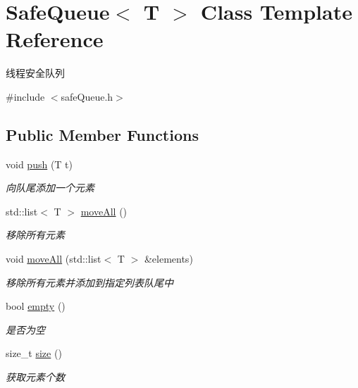 \hypertarget{classSafeQueue}{\section{Safe\-Queue$<$ T $>$ Class Template Reference}
\label{classSafeQueue}
}


线程安全队列  




{\ttfamily \#include $<$safe\-Queue.\-h$>$}

\subsection*{Public Member Functions}
\begin{DoxyCompactItemize}
\item 
\hypertarget{classSafeQueue_a9f9e5e3ad0251438e5d0d22acf42ec6c}{void \hyperlink{classSafeQueue_a9f9e5e3ad0251438e5d0d22acf42ec6c}{push} (T t)}\label{classSafeQueue_a9f9e5e3ad0251438e5d0d22acf42ec6c}

\begin{DoxyCompactList}\small\item\em 向队尾添加一个元素 \end{DoxyCompactList}\item 
std\-::list$<$ T $>$ \hyperlink{classSafeQueue_a0231290c5b785ac7ac5ba966c1160531}{move\-All} ()
\begin{DoxyCompactList}\small\item\em 移除所有元素 \end{DoxyCompactList}\item 
void \hyperlink{classSafeQueue_a1f853236e45bdc59d528b11cd5584d23}{move\-All} (std\-::list$<$ T $>$ \&elements)
\begin{DoxyCompactList}\small\item\em 移除所有元素并添加到指定列表队尾中 \end{DoxyCompactList}\item 
\hypertarget{classSafeQueue_ab28c475e4b507c354d67d63460ca434d}{bool \hyperlink{classSafeQueue_ab28c475e4b507c354d67d63460ca434d}{empty} ()}\label{classSafeQueue_ab28c475e4b507c354d67d63460ca434d}

\begin{DoxyCompactList}\small\item\em 是否为空 \end{DoxyCompactList}\item 
\hypertarget{classSafeQueue_a458b819b22e7db4d498e1253856fbfc7}{size\-\_\-t \hyperlink{classSafeQueue_a458b819b22e7db4d498e1253856fbfc7}{size} ()}\label{classSafeQueue_a458b819b22e7db4d498e1253856fbfc7}

\begin{DoxyCompactList}\small\item\em 获取元素个数 \end{DoxyCompactList}\end{DoxyCompactItemize}


